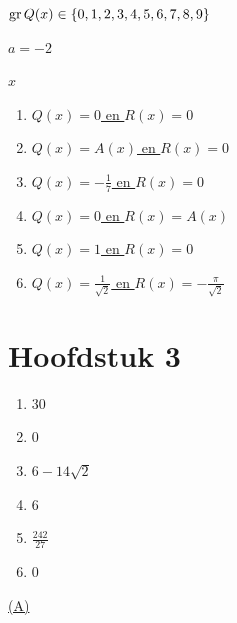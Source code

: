 \documentclass{ximera}
\begin{document}
\begin{Antwoord} \label{antw2.17}
\hyperlink{oef2.17}{$\operatorname{gr} Q(x) \in \left\{0,1,2,3,4,5,6,7,8,9\right\}$}
\end{Antwoord}

\begin{Antwoord} \label{antw2.18}
\hyperlink{oef2.18}{$a=-2$}
\end{Antwoord}

\begin{Antwoord} \label{antw2.19}
\hyperlink{oef2.19}{$x$}
\end{Antwoord}

\begin{Antwoord} \label{antw2.20}
\begin{enumerate}
\item
\hyperlink{oef2.20}{$Q(x) = 0$ en $R(x) = 0$}
\item
\hyperlink{oef2.20}{$Q(x) = A(x)$ en $R(x) = 0$}
\item
\hyperlink{oef2.20}{$Q(x) = -\frac{1}{7}$ en $R(x) = 0$}
\item
\hyperlink{oef2.20}{$Q(x) = 0$ en $R(x) = A(x)$}
\item
\hyperlink{oef2.20}{$Q(x) = 1$ en $R(x) = 0$}
\item
\hyperlink{oef2.20}{$Q(x) = \frac{1}{\sqrt{2}}$ en $R(x) =-\frac{\pi}{\sqrt{2}}$}
\end{enumerate}
\setcounter{enumi}{0}
\end{Antwoord}

\section*{Hoofdstuk 3}

\begin{Antwoord} \label{antw3.1}
\begin{enumerate}

\item
\hyperlink{oef3.1}{$30$}
\item
\hyperlink{oef3.1}{$0$}
\item
\hyperlink{oef3.1}{$6-14\sqrt{2}$}
\item
\hyperlink{oef3.1}{$6$}
\item
\hyperlink{oef3.1}{$\frac{242}{27}$}
\item
\hyperlink{oef3.1}{$0$}
\end{enumerate}
\end{Antwoord}

\begin{Antwoord} \label{antw3.2}
\hyperlink{oef3.2}{(A)}
\end{Antwoord}
\end{document}
